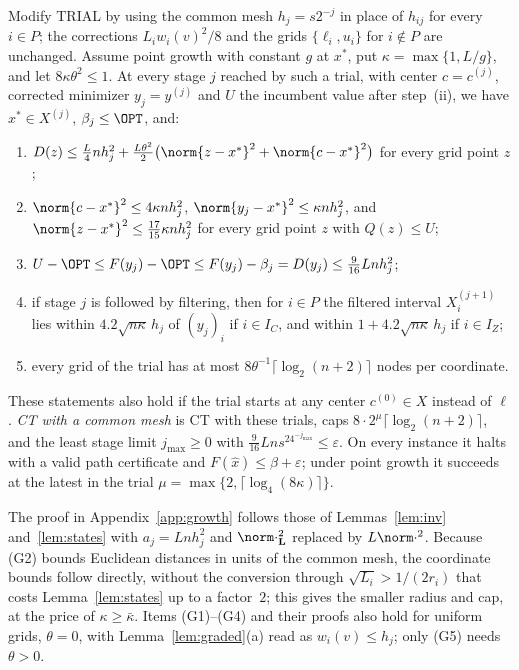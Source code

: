 \begin{lemma}\label{lem:commonmesh}
Modify TRIAL by using the common mesh $h_j=s2^{-j}$ in place of $h_{ij}$ for
every $i\in P$; the corrections $L_iw_i(v)^2/8$ and the grids
$\{\ell_i,u_i\}$ for $i\notin P$ are unchanged. Assume point growth with
constant $g$ at $x^*$, put $\kappa=\max\{1,L/g\}$, and let
$8\kappa\theta^2\le1$. At every stage $j$ reached by such a trial, with
center $c=c^{(j)}$, corrected minimizer $y_j=y^{(j)}$ and $U$ the incumbent
value after step~(ii), we have $x^*\in X^{(j)}$, $\beta_j\le\OPT$, and:
\begin{enumerate}[label=(G\arabic*)]
\item $D(z)\le\frac L4nh_j^2+\frac{L\theta^2}2\bigl(\norm{z-x^*}^2
+\norm{c-x^*}^2\bigr)$ for every grid point $z$;
\item $\norm{c-x^*}^2\le4\kappa nh_j^2$, $\norm{y_j-x^*}^2\le\kappa nh_j^2$,
and $\norm{z-x^*}^2\le\frac{17}{15}\kappa nh_j^2$ for every grid point $z$
with $Q(z)\le U$;
\item $U-\OPT\le F(y_j)-\OPT\le F(y_j)-\beta_j=D(y_j)\le\frac9{16}Lnh_j^2$;
\item if stage $j$ is followed by filtering, then for $i\in P$ the filtered
interval $X_i^{(j+1)}$ lies within $4.2\sqrt{n\kappa}\,h_j$ of $(y_j)_i$ if
$i\in I_C$, and within $1+4.2\sqrt{n\kappa}\,h_j$ if $i\in I_Z$;
\item every grid of the trial has at most
$8\theta^{-1}\lceil\log_2(n+2)\rceil$ nodes per coordinate.
\end{enumerate}
These statements also hold if the trial starts at any center
$c^{(0)}\in X$ instead of $\ell$.
\emph{CT with a common mesh} is CT with these trials, caps
$8\cdot2^\mu\lceil\log_2(n+2)\rceil$, and the least stage limit
$j_{\max}\ge0$ with $\frac9{16}Lns^24^{-j_{\max}}\le\varepsilon$. On every
instance it halts with a valid path certificate and
$F(\hat x)\le\beta+\varepsilon$; under point growth it succeeds at the latest
in the trial
$\mu=\max\{2,\lceil\log_4(8\kappa)\rceil\}$.
\end{lemma}

The proof in Appendix~\ref{app:growth} follows those of
Lemmas~\ref{lem:inv} and~\ref{lem:states} with $a_j=Lnh_j^2$ and
$\norm\cdot_{\mathbf L}^2$ replaced by $L\norm\cdot^2$. Because (G2) bounds
Euclidean distances in units of the common mesh, the coordinate bounds
follow directly, without the conversion through $\sqrt{L_i}>1/(2r_i)$ that
costs Lemma~\ref{lem:states} up to a factor~$2$; this gives the smaller
radius and cap, at the price of $\kappa\ge\bar\kappa$. Items (G1)--(G4) and
their proofs also hold for uniform grids, $\theta=0$, with
Lemma~\ref{lem:graded}(a) read as $w_i(v)\le h_j$; only (G5) needs
$\theta>0$.

